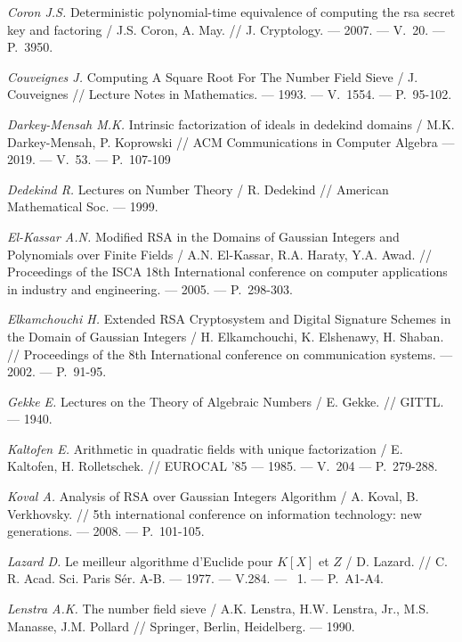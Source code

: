 \begin{thebibliography}{99}
    \textit{Coron J.S.} Deterministic polynomial-time equivalence of computing the rsa secret key and factoring / J.S. Coron, A. May. // J. Cryptology. --- 2007. --- V.~20. --- P.~3950.

    \textit{Couveignes J.} Computing A Square Root For The Number Field Sieve / J. Couveignes // Lecture Notes in Mathematics. --- 1993. --- V.~1554. --- P.~95-102.

    \textit{Darkey-Mensah M.K.} Intrinsic factorization of ideals in dedekind domains / M.K. Darkey-Mensah, P. Koprowski // ACM Communications in Computer Algebra --- 2019. --- V.~53. --- P.~107-109

    \textit{Dedekind R.} Lectures on Number Theory / R. Dedekind // American Mathematical Soc. --- 1999.

    \textit{El-Kassar A.N.} Modified RSA in the Domains of Gaussian Integers and Polynomials over Finite Fields / A.N. El-Kassar, R.A. Haraty, Y.A. Awad. // Proceedings of the ISCA 18th International conference on computer applications in industry and engineering. --- 2005. --- P.~298-303.

    \textit{Elkamchouchi H.} Extended RSA Cryptosystem and Digital Signature Schemes in the Domain of Gaussian Integers / H. Elkamchouchi, K. Elshenawy, H. Shaban. // Proceedings of the 8th International conference on communication systems. --- 2002. --- P.~91-95.

    \textit{Gekke E.} Lectures on the Theory of Algebraic Numbers / E. Gekke. // GITTL. --- 1940.
    
    \textit{Kaltofen E.} Arithmetic in quadratic fields with unique factorization / E. Kaltofen, H. Rolletschek. // EUROCAL '85 --- 1985. --- V.~204 --- P.~279-288.

    \textit{Koval A.} Analysis of RSA over Gaussian Integers Algorithm / A. Koval, B. Verkhovsky. // 5th international conference on information technology: new generations. --- 2008. --- {P.}~101-105.
    
    \textit{Lazard D.} Le meilleur algorithme d'{E}uclide pour {$K[X]$} et {$Z$} / D. Lazard. // C. R. Acad. Sci. Paris S\'er. A-B. --- 1977. --- V.284. --- \textnumero~1. --- P.~A1-A4.
    
    \textit{Lenstra A.K.} The number field sieve / A.K. Lenstra, H.W. Lenstra, Jr., M.S. Manasse, J.M. Pollard // Springer, Berlin, Heidelberg. --- 1990.


\end{thebibliography}
